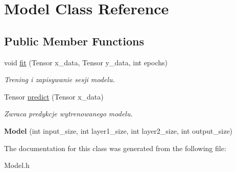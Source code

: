 \hypertarget{classModel}{}\section{Model Class Reference}
\label{classModel}
\subsection*{Public Member Functions}
\begin{DoxyCompactItemize}
\item 
\mbox{\label{classModel_ae512a2ec2f60666cdae555685549b1cc}} 
void \hyperlink{classModel_ae512a2ec2f60666cdae555685549b1cc}{fit} (Tensor x\+\_\+data, Tensor y\+\_\+data, int epochs)
\begin{DoxyCompactList}\small\item\em Trening i zapisywanie sesji modelu. \end{DoxyCompactList}\item 
\mbox{\label{classModel_acc37b2cf8d52f53b0d8710552b13ab21}} 
Tensor \hyperlink{classModel_acc37b2cf8d52f53b0d8710552b13ab21}{predict} (Tensor x\+\_\+data)
\begin{DoxyCompactList}\small\item\em Zwraca predykcje wytrenowanego modelu. \end{DoxyCompactList}\item 
\mbox{\label{classModel_ab8a74fc79e8dab3b589ed63de60e8123}} 
{\bfseries Model} (int input\+\_\+size, int layer1\+\_\+size, int layer2\+\_\+size, int output\+\_\+size)
\end{DoxyCompactItemize}


The documentation for this class was generated from the following file\+:\begin{DoxyCompactItemize}
\item 
Model.\+h\end{DoxyCompactItemize}
